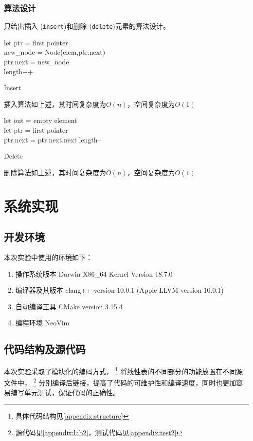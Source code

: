 \subsubsection{算法设计}
只给出插入 (\texttt{insert})和删除 (\texttt{delete})元素的算法设计。
\newline
\begin{algorithm}[H]
    \SetAlgoLined
    let ptr = first pointer\\
    new\_node = Node(elem,ptr.next)\\
    ptr.next = new\_node\\
    length++
\caption{Insert}\label{alg:insert2}
\end{algorithm}
插入算法如上述，其时间复杂度为$O(n)$，空间复杂度为$O(1)$
\begin{algorithm}[H]
    \SetAlgoLined
    let out = empty element
    \\
    let ptr = first pointer\\
    ptr.next = ptr.next.next
    length--
\caption{Delete}\label{alg:delete2}
\end{algorithm}
删除算法如上述，其时间复杂度为$O(n)$，空间复杂度为$O(1)$
\section{系统实现}
\subsection{开发环境}
本次实验中使用的环境如下：
\begin{enumerate}
    \item 操作系统版本 Darwin X86\_64 Kernel Version 18.7.0
    \item 编译器及其版本 clang++ version 10.0.1 (Apple LLVM version 10.0.1)
    \item 自动编译工具 CMake version 3.15.4
    \item 编程环境 NeoVim
\end{enumerate}
\subsection{代码结构及源代码}
本次实验采取了模块化的编码方式，
\footnote{具体代码结构见\autoref{appendix:structure}}
将线性表的不同部分的功能放置在不同源文件中，
\footnote{源代码见\autoref{appendix:lab2}，测试代码见\autoref{appendix:test2}}
分别编译后链接，提高了代码的可维护性和编译速度，同时也更加容易编写单元测试，保证代码的正确性。

